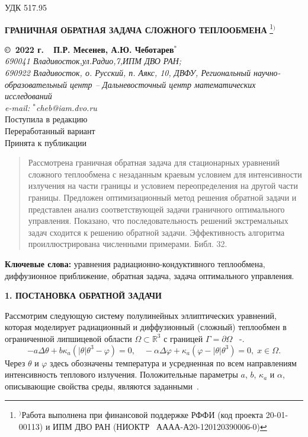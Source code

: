 \documentclass[12pt]{article}
\begin{document}
    \def\figurename{Фиг.}
    УДК 517.95
    \begin{center}
        \textbf{ ГРАНИЧНАЯ ОБРАТНАЯ ЗАДАЧА СЛОЖНОГО ТЕПЛООБМЕНА }
        \footnote[{1}]{$^)$Работа выполнена при финансовой поддержке РФФИ (код проекта 20-01-00113) и ИПМ ДВО РАН
            (НИОКТР \textnumero~АААА-А20-120120390006-0)}$^)$
    \end{center}
    \begin{center}
        \textbf{ \copyright\  2022 г.\ \  П.Р. Месенев, А.Ю. Чеботарев$^{*}$}
        \\
        \textit{ 690041 Владивосток,ул.Радио,7,ИПМ ДВО РАН;\\ 690922 Владивосток, о. Русский, п. Аякс, 10, ДВФУ,
            Региональный научно-образовательный центр -- Дальневосточный центр математических исследований\\
            e-mail:  $^{*}$cheb@iam.dvo.ru}\\
        {\small  Поступила в редакцию \\ Переработанный вариант\\
        Принята к публикации }
    \end{center}

    \sloppy
    \begin{quote}
        \small
        Рассмотрена граничная обратная задача для стационарных уравнений сложного теплообмена с незаданным краевым условием для интенсивности излучения на части границы и условием переопределения на другой части границы.
        Предложен оптимизационный метод решения обратной задачи и представлен анализ соответствующей задачи
        граничного оптимального управления.
        Показано, что последовательность решений экстремальных задач
        сходится к решению обратной задачи.
        Эффективность алгоритма проиллюстрирована численными примерами.
        Библ.
        32.
    \end{quote}
    \textbf{ Ключевые слова:} уравнения радиационно-кондуктивного теплообмена, диффузионное
    приближение, обратная задача, задача оптимального управления.

    \begin{center}
        \textbf{1. ПОСТАНОВКА ОБРАТНОЙ ЗАДАЧИ}
    \end{center}

    Рассмотрим следующую систему полулинейных эллиптических уравнений, которая
    моделирует радиационный и диффузионный (сложный) теплообмен в
    ограниченной липшицевой области $\Omega\subset \mathbb{R}^3$ с границей
    $\Gamma=\partial\Omega$ ~\cite{Pinnau07}-\cite{Kovt14-1}.
    \begin{equation}
        \label{eq1}
        - a\Delta\theta + b\kappa_a(|\theta|\theta^3- \varphi)=0,   \quad
        -\alpha \Delta \varphi + \kappa_a(\varphi-|\theta|\theta^3)=0,\; x\in\Omega.
    \end{equation}
    Через $\theta$ и $\varphi$ здесь обозначены температура и усредненная по всем
    направлениям интенсивность теплового излучения. Положительные параметры
    $a$, $b$, $\kappa_a$ и $\alpha$, описывающие
    свойства среды, являются заданными~\cite{Kovt14-1}.
\end{document}
